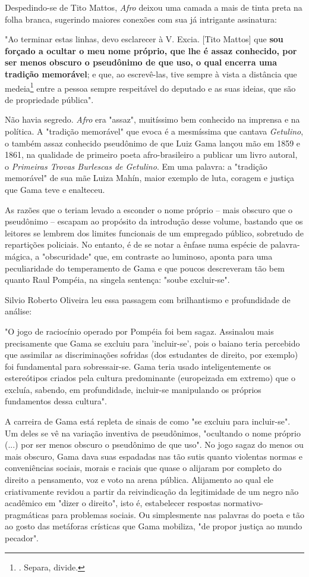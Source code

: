 Despedindo-se de Tito Mattos, \emph{Afro} deixou uma camada a mais de
tinta preta na folha branca, sugerindo maiores conexões com sua já
intrigante assinatura:

"Ao terminar estas linhas, devo esclarecer à V. Excia. {[}Tito Mattos{]}
que \textbf{sou forçado a ocultar o meu nome próprio, que lhe é assaz
conhecido, por ser menos obscuro o pseudônimo de que uso, o qual encerra
uma tradição memorável}; e que, ao escrevê-las, tive sempre à vista a
distância que medeia\footnote{. Separa, divide.} entre a pessoa sempre
respeitável do deputado e as suas ideias, que são de propriedade
pública".

Não havia segredo. \emph{Afro} era "assaz", muitíssimo bem conhecido na
imprensa e na política. A "tradição memorável" que evoca é a mesmíssima
que cantava \emph{Getulino}, o também assaz conhecido pseudônimo de que
Luiz Gama lançou mão em 1859 e 1861, na qualidade de primeiro poeta
afro-brasileiro a publicar um livro autoral, o \emph{Primeiras Trovas
Burlescas de Getulino}. Em uma palavra: a "tradição memorável" de sua
mãe Luiza Mahín, maior exemplo de luta, coragem e justiça que Gama teve
e enalteceu.

As razões que o teriam levado a esconder o nome próprio -- mais obscuro
que o pseudônimo -- escapam ao propósito da introdução desse volume,
bastando que os leitores se lembrem dos limites funcionais de um
empregado público, sobretudo de repartições policiais. No entanto, é de
se notar a ênfase numa espécie de palavra-mágica, a "obscuridade" que,
em contraste ao luminoso, aponta para uma peculiaridade do temperamento
de Gama e que poucos descreveram tão bem quanto Raul Pompéia, na singela
sentença: "soube excluir-se".

Silvio Roberto Oliveira leu essa passagem com brilhantismo e
profundidade de análise:

"O jogo de raciocínio operado por Pompéia foi bem sagaz. Assinalou mais
precisamente que Gama se excluiu para 'incluir-se', pois o baiano teria
percebido que assimilar as discriminações sofridas (dos estudantes de
direito, por exemplo) foi fundamental para sobressair-se. Gama teria
usado inteligentemente os estereótipos criados pela cultura predominante
(europeizada em extremo) que o excluía, sabendo, em profundidade,
incluir-se manipulando os próprios fundamentos dessa cultura".

A carreira de Gama está repleta de sinais de como "se excluiu para
incluir-se". Um deles se vê na variação inventiva de pseudônimos,
"ocultando o nome próprio (...) por ser menos obscuro o pseudônimo de
que uso". No jogo sagaz do menos ou mais obscuro, Gama dava suas
espadadas nas tão sutis quanto violentas normas e conveniências sociais,
morais e raciais que quase o alijaram por completo do direito a
pensamento, voz e voto na arena pública. Alijamento ao qual ele
criativamente revidou a partir da reivindicação da legitimidade de um
negro não acadêmico em "dizer o direito", isto é, estabelecer respostas
normativo-pragmáticas para problemas sociais. Ou simplesmente nas
palavras do poeta e tão ao gosto das metáforas crísticas que Gama
mobiliza, "de propor justiça ao mundo pecador".

